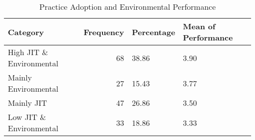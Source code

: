 \begin{table}[htbp]
    \centering
    \caption{Practice Adoption and Environmental Performance}
    \label{tab:your_label}
    \begin{tabular}{lrll}
\toprule
Category & Frequency & Percentage & Mean of Performance \\
\midrule
High JIT \& Environmental & 68 & 38.86 & 3.90 \\
Mainly Environmental & 27 & 15.43 & 3.77 \\
Mainly JIT & 47 & 26.86 & 3.50 \\
Low JIT \& Environmental & 33 & 18.86 & 3.33 \\
\bottomrule
\end{tabular}

    \end{table}
    